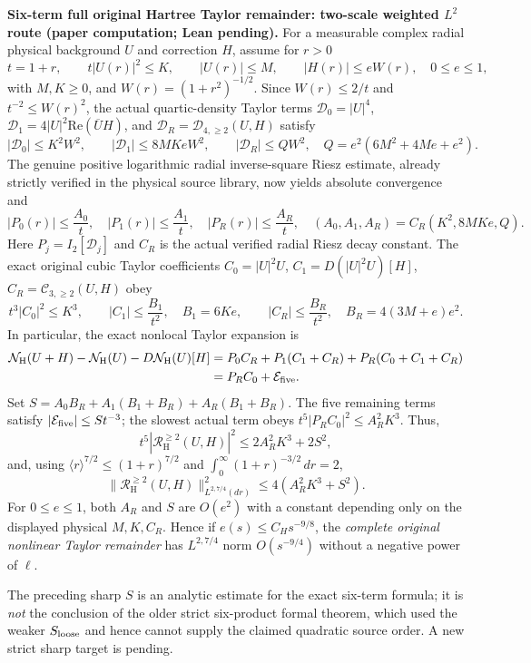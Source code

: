 \documentclass[11pt]{amsart}
\begin{document}
\medskip
\noindent\textbf{Six-term full original Hartree Taylor remainder:
two-scale weighted \(L^2\) route (paper computation; Lean pending).}
For a measurable complex radial physical background $U$ and correction
$H$, assume for $r>0$
\[
 t=1+r,\qquad t|U(r)|^2\le K,\qquad |U(r)|\le M,
 \qquad |H(r)|\le eW(r),\quad 0\le e\le 1,
\]
with $M,K\ge0$, and $W(r)=(1+r^2)^{-1/2}$. Since
$W(r)\le 2/t$ and $t^{-2}\le W(r)^2$, the actual quartic-density
Taylor terms $\mathcal D_0=|U|^4$,
$\mathcal D_1=4|U|^2\mathrm{Re}(\overline U H)$,
and $\mathcal D_R=\mathcal D_{4,\ge2}(U,H)$ satisfy
\[
 |\mathcal D_0|\le K^2W^2,\qquad
 |\mathcal D_1|\le 8MKeW^2,\qquad
 |\mathcal D_R|\le QW^2,\quad
 Q=e^2(6M^2+4Me+e^2).
\]
The genuine positive logarithmic radial inverse-square
Riesz estimate, already strictly verified in the physical source
library, now yields absolute convergence and
\[
 |P_0(r)|\le\frac{A_0}{t},\quad
 |P_1(r)|\le\frac{A_1}{t},\quad
 |P_R(r)|\le\frac{A_R}{t},
 \quad
 (A_0,A_1,A_R)
 =C_R(K^2,8MKe,Q).
\]
Here $P_j=I_2[\mathcal D_j]$ and $C_R$ is the actual
verified radial Riesz decay constant.
The exact original cubic Taylor coefficients
$C_0=|U|^2U$, $C_1=D(|U|^2U)[H]$,
$C_R=\mathcal C_{3,\ge2}(U,H)$ obey
\[
 t^3|C_0|^2\le K^3,\qquad
 |C_1|\le\frac{B_1}{t^2},\quad B_1=6Ke,
 \qquad
 |C_R|\le\frac{B_R}{t^2},\quad
 B_R=4(3M+e)e^2.
\]
In particular, the exact nonlocal Taylor expansion is
\[
\begin{aligned}
 \mathcal N_{\mathrm H}(U+H)-\mathcal N_{\mathrm H}(U)
  -D\mathcal N_{\mathrm H}(U)[H]
   &= P_0C_R+P_1(C_1+C_R)+P_R(C_0+C_1+C_R)\\
   &= P_RC_0+\mathcal E_{\rm five}.
\end{aligned}
\]
Set $S=A_0B_R+A_1(B_1+B_R)+A_R(B_1+B_R)$.
The five remaining terms satisfy $|\mathcal E_{\rm five}|
\le St^{-3}$; the slowest actual term obeys
$t^5|P_RC_0|^2\le A_R^2K^3$. Thus,
\[
 t^5|\mathcal R_{\mathrm H}^{\ge2}(U,H)|^2
 \le 2A_R^2K^3+2S^2,
\]
and, using
$\langle r\rangle^{7/2}\le(1+r)^{7/2}$ and
$\int_0^\infty(1+r)^{-3/2}\,dr=2$,
\[
 \boxed{\ 
 \bigl\|\mathcal R_{\mathrm H}^{\ge2}(U,H)
       \bigr\|_{L^{2,7/4}(dr)}^2
  \le 4(A_R^2K^3+S^2).\ }
\]
For $0\le e\le1$, both $A_R$ and $S$ are $O(e^2)$
with a constant depending only on the displayed physical
$M,K,C_R$. Hence if $e(s)\le C_H s^{-9/8}$,
the \emph{complete original nonlinear Taylor remainder} has
$L^{2,7/4}$ norm $O(s^{-9/4})$ without a negative
power of $\ell$.

The preceding sharp $S$ is an analytic estimate for the exact six-term
formula; it is \emph{not} the conclusion of the older strict six-product
formal theorem, which used the weaker $S_{\rm loose}$ and hence cannot
supply the claimed quadratic source order.  A new strict sharp target
is pending.\par
\end{document}
